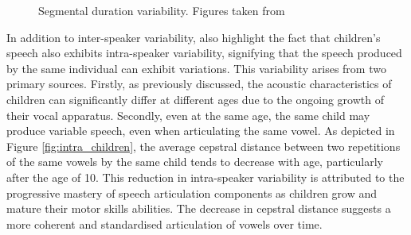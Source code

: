\begin{figure}[ht]
\centering
{}
\caption{Segmental duration variability. Figures taken from \cite{Acoustic_change_children}}
\end{figure}


In addition to inter-speaker variability, \cite{Acoustic_change_children} also highlight the fact that children's speech also exhibits intra-speaker variability, signifying that the speech produced by the same individual can exhibit variations. This variability arises from two primary sources. Firstly, as previously discussed, the acoustic characteristics of children can significantly differ at different ages due to the ongoing growth of their vocal apparatus.  Secondly, even at the same age, the same child may produce variable speech, even when articulating the same vowel. As depicted in Figure \ref{fig:intra_children}, the average cepstral distance between two repetitions of the same vowels by the same child tends to decrease with age, particularly after the age of 10. This reduction in intra-speaker variability is attributed to the progressive mastery of speech articulation components as children grow and mature their motor skills abilities. The decrease in cepstral distance suggests a more coherent and standardised articulation of vowels over time.

